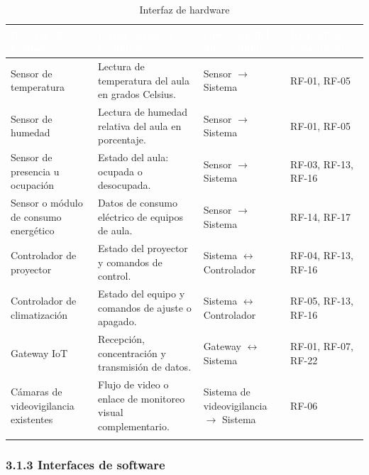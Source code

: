\begingroup
\small
\begin{longtable}{|P{0.2500}|P{0.2500}|P{0.2500}|P{0.2500}|}
\hline
{}\textcolor{white}{\textbf{Interfaz de hardware}} & \textcolor{white}{\textbf{Datos enviados o recibidos}} & \textcolor{white}{\textbf{Dirección del intercambio}} & \textcolor{white}{\textbf{Requisitos relacionados}} \\ \hline
Sensor de temperatura & Lectura de temperatura del aula en grados Celsius. & Sensor $\rightarrow$ Sistema & RF-01, RF-05 \\ \hline
Sensor de humedad & Lectura de humedad relativa del aula en porcentaje. & Sensor $\rightarrow$ Sistema & RF-01, RF-05 \\ \hline
Sensor de presencia u ocupación & Estado del aula: ocupada o desocupada. & Sensor $\rightarrow$ Sistema & RF-03, RF-13, RF-16 \\ \hline
Sensor o módulo de consumo energético & Datos de consumo eléctrico de equipos de aula. & Sensor $\rightarrow$ Sistema & RF-14, RF-17 \\ \hline
Controlador de proyector & Estado del proyector y comandos de control. & Sistema $\leftrightarrow$ Controlador & RF-04, RF-13, RF-16 \\ \hline
Controlador de climatización & Estado del equipo y comandos de ajuste o apagado. & Sistema $\leftrightarrow$ Controlador & RF-05, RF-13, RF-16 \\ \hline
Gateway IoT & Recepción, concentración y transmisión de datos. & Gateway $\leftrightarrow$ Sistema & RF-01, RF-07, RF-22 \\ \hline
Cámaras de videovigilancia existentes & Flujo de video o enlace de monitoreo visual complementario. & Sistema de videovigilancia $\rightarrow$ Sistema & RF-06 \\ \hline
\caption{Interfaz de hardware}
\end{longtable}
\endgroup

\subsubsection*{3.1.3 Interfaces de software}



